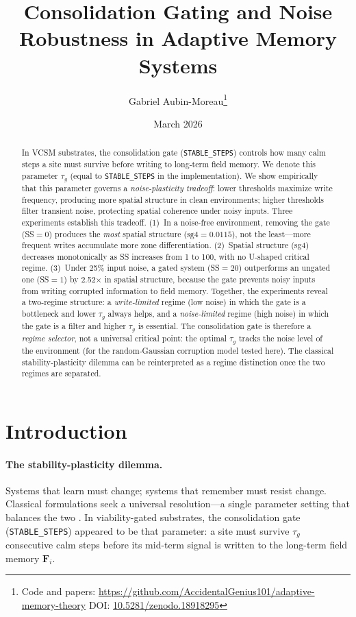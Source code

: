 \documentclass[11pt,twocolumn]{article}
\title{\textbf{Consolidation Gating and Noise Robustness in Adaptive Memory Systems}}
\author{Gabriel Aubin-Moreau\thanks{Code and papers: \url{https://github.com/AccidentalGenius101/adaptive-memory-theory} \quad DOI: \href{https://doi.org/10.5281/zenodo.18918295}{10.5281/zenodo.18918295}}}
\date{March 2026}
\begin{document}
\maketitle

\begin{abstract}
In VCSM substrates, the consolidation gate (\texttt{STABLE\_STEPS}) controls
how many calm steps a site must survive before writing to long-term field memory.
We denote this parameter $\tau_g$ (equal to \texttt{STABLE\_STEPS} in the implementation).
We show empirically that this parameter governs a \emph{noise-plasticity tradeoff}:
lower thresholds maximize write frequency, producing more spatial structure in
clean environments; higher thresholds filter transient noise, protecting spatial
coherence under noisy inputs.
Three experiments establish this tradeoff.
(1)~In a noise-free environment, removing the gate (SS$=0$) produces the
\emph{most} spatial structure ($\text{sg4} = 0.0115$), not the least---more
frequent writes accumulate more zone differentiation.
(2)~Spatial structure (sg4) decreases monotonically as SS increases from 1 to 100,
with no U-shaped critical regime.
(3)~Under 25\% input noise, a gated system (SS$=20$) outperforms an ungated
one (SS$=1$) by 2.52$\times$ in spatial structure, because the gate prevents
noisy inputs from writing corrupted information to field memory.
Together, the experiments reveal a two-regime structure: a \emph{write-limited}
regime (low noise) in which the gate is a bottleneck and lower $\tau_g$ always
helps, and a \emph{noise-limited} regime (high noise) in which the gate is a
filter and higher $\tau_g$ is essential.
The consolidation gate is therefore a \emph{regime selector}, not a universal
critical point: the optimal $\tau_g$ tracks the noise level of the environment
(for the random-Gaussian corruption model tested here).
The classical stability-plasticity dilemma can be reinterpreted as a regime distinction once the two regimes are separated.
\end{abstract}

\section{Introduction}

\paragraph{The stability-plasticity dilemma.}
Systems that learn must change; systems that remember must resist change.
Classical formulations seek a universal resolution---a single parameter setting
that balances the two \cite{grossberg1980}. In viability-gated substrates,
the consolidation gate (\texttt{STABLE\_STEPS}) appeared to be that parameter:
a site must survive $\tau_g$ consecutive calm steps before its mid-term signal
is written to the long-term field memory $\mathbf{F}_i$.
\end{document}
